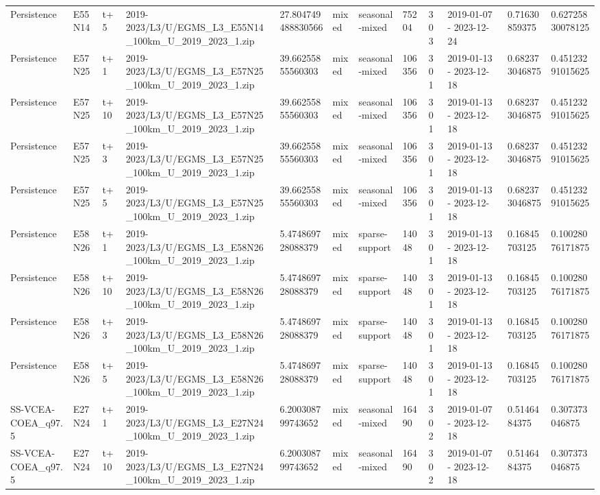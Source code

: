 \begin{landscape}
\begin{longtable}{llllllllllll}
Persistence & E55N14 & t+5 & 2019-2023/L3/U/EGMS\_L3\_E55N14\_100km\_U\_2019\_2023\_1.zip & 27.804749488830566 & mixed & seasonal-mixed & 75204 & 303 & 2019-01-07 - 2023-12-24 & 0.71630859375 & 0.62725830078125 \\
Persistence & E57N25 & t+1 & 2019-2023/L3/U/EGMS\_L3\_E57N25\_100km\_U\_2019\_2023\_1.zip & 39.66255855560303 & mixed & seasonal-mixed & 106356 & 301 & 2019-01-13 - 2023-12-18 & 0.682373046875 & 0.45123291015625 \\
Persistence & E57N25 & t+10 & 2019-2023/L3/U/EGMS\_L3\_E57N25\_100km\_U\_2019\_2023\_1.zip & 39.66255855560303 & mixed & seasonal-mixed & 106356 & 301 & 2019-01-13 - 2023-12-18 & 0.682373046875 & 0.45123291015625 \\
Persistence & E57N25 & t+3 & 2019-2023/L3/U/EGMS\_L3\_E57N25\_100km\_U\_2019\_2023\_1.zip & 39.66255855560303 & mixed & seasonal-mixed & 106356 & 301 & 2019-01-13 - 2023-12-18 & 0.682373046875 & 0.45123291015625 \\
Persistence & E57N25 & t+5 & 2019-2023/L3/U/EGMS\_L3\_E57N25\_100km\_U\_2019\_2023\_1.zip & 39.66255855560303 & mixed & seasonal-mixed & 106356 & 301 & 2019-01-13 - 2023-12-18 & 0.682373046875 & 0.45123291015625 \\
Persistence & E58N26 & t+1 & 2019-2023/L3/U/EGMS\_L3\_E58N26\_100km\_U\_2019\_2023\_1.zip & 5.474869728088379 & mixed & sparse-support & 14048 & 301 & 2019-01-13 - 2023-12-18 & 0.16845703125 & 0.10028076171875 \\
Persistence & E58N26 & t+10 & 2019-2023/L3/U/EGMS\_L3\_E58N26\_100km\_U\_2019\_2023\_1.zip & 5.474869728088379 & mixed & sparse-support & 14048 & 301 & 2019-01-13 - 2023-12-18 & 0.16845703125 & 0.10028076171875 \\
Persistence & E58N26 & t+3 & 2019-2023/L3/U/EGMS\_L3\_E58N26\_100km\_U\_2019\_2023\_1.zip & 5.474869728088379 & mixed & sparse-support & 14048 & 301 & 2019-01-13 - 2023-12-18 & 0.16845703125 & 0.10028076171875 \\
Persistence & E58N26 & t+5 & 2019-2023/L3/U/EGMS\_L3\_E58N26\_100km\_U\_2019\_2023\_1.zip & 5.474869728088379 & mixed & sparse-support & 14048 & 301 & 2019-01-13 - 2023-12-18 & 0.16845703125 & 0.10028076171875 \\
SS-VCEA-COEA\_q97.5 & E27N24 & t+1 & 2019-2023/L3/U/EGMS\_L3\_E27N24\_100km\_U\_2019\_2023\_1.zip & 6.200308799743652 & mixed & seasonal-mixed & 16490 & 302 & 2019-01-07 - 2023-12-18 & 0.5146484375 & 0.307373046875 \\
SS-VCEA-COEA\_q97.5 & E27N24 & t+10 & 2019-2023/L3/U/EGMS\_L3\_E27N24\_100km\_U\_2019\_2023\_1.zip & 6.200308799743652 & mixed & seasonal-mixed & 16490 & 302 & 2019-01-07 - 2023-12-18 & 0.5146484375 & 0.307373046875 \\

\end{longtable}
\end{landscape}
